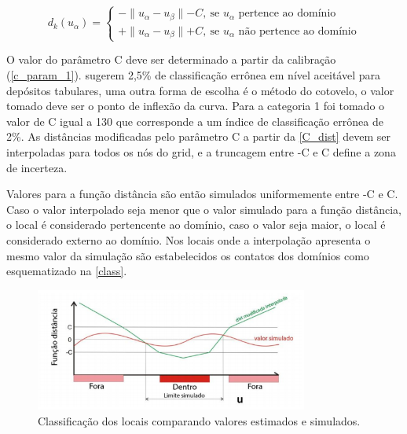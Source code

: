 \begin{equation}
	d_k(u_\alpha)=\begin{cases}
	-\parallel u_\alpha-u_\beta\parallel - C,\:\textrm{se $u_\alpha$ pertence ao domínio}\\
	+\parallel u_\alpha-u_\beta\parallel + C,\:\textrm{se $u_\alpha$ não pertence ao domínio}\end{cases}
    \label{C_dist}
\end{equation}

O valor do parâmetro C deve ser determinado a partir da calibração (\autoref{c_param_1}).  sugerem 2,5\% de classificação errônea em nível aceitável para depósitos tabulares, uma outra forma de escolha é o método do cotovelo, o valor tomado deve ser o ponto de inflexão da curva. Para a categoria 1 foi tomado o valor de C igual a 130 que corresponde a um índice de classificação errônea de 2\%. As distâncias modificadas pelo parâmetro C a partir da \autoref{C_dist} devem ser interpoladas para todos os nós do grid, e a truncagem entre -C e C define a zona de incerteza.

Valores para a função distância são então simulados uniformemente entre -C e C. Caso o valor interpolado seja menor que o valor simulado para a função distância, o local é considerado pertencente ao domínio, caso o valor seja maior, o local é considerado externo ao domínio. Nos locais onde a interpolação apresenta o mesmo valor da simulação são estabelecidos os contatos dos domínios como esquematizado na \autoref{class}.

\begin{figure}[H]
	\caption{\label{class}Classificação dos locais comparando valores estimados e simulados.}
	\begin{center}
		\includegraphics[width=0.8\textwidth]{capitulo_2/classificacao.png}
	\end{center}
\end{figure}

